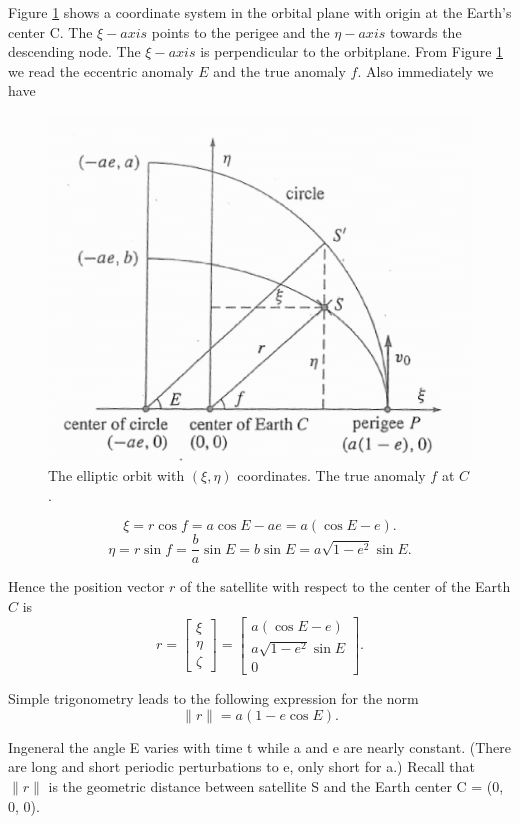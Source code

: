 	Figure \ref{fig:9-8} shows a coordinate system in the orbital plane with origin at the Earth’s center C. The $\xi-axis$ points to the perigee and the $\eta-axis$ towards the descending node. The $\xi-axis$ is perpendicular to the orbitplane. From Figure \ref{fig:9-8} we read the eccentric anomaly $E$ and the true anomaly $f$. Also immediately we have
	\begin{figure}
		\centering
		\includegraphics[width=0.7\linewidth]{TeX_files/Part03/chapter09/image/9-8}
		\caption{The elliptic orbit with $(\xi,\eta)$ coordinates. The true anomaly $f$ at $C$.}
		\label{fig:9-8}
	\end{figure}
	$$\xi = r \cos f = a \cos E - ae = a (\cos E -e). $$
	$$\eta = r \sin f = \frac{b}{a} \sin E = b \sin E = a\sqrt{1-e^2}\sin E.$$

	Hence the position vector $r$ of the satellite with respect to the center of the Earth $C$ is
	\begin{equation}\label{eq:9.5}
		r=\begin{bmatrix}
		\xi \\ \eta \\ \zeta
		\end{bmatrix}
		=\begin{bmatrix}
		a(\cos E -e) \\
		a\sqrt{1-e^2}\sin E \\
		0
		\end{bmatrix}.
	\end{equation}
	
	Simple trigonometry leads to the following expression for the norm
	\begin{equation}\label{eq:9.6}
		\lVert r \lVert = a(1-e\cos E).
	\end{equation}
	
	Ingeneral the angle E varies with time t while a and e are nearly constant. (There are long and short periodic perturbations to e, only short for a.) Recall that $\lVert r \lVert$ is the geometric distance between satellite S and the Earth center C = (0, 0, 0).
	
